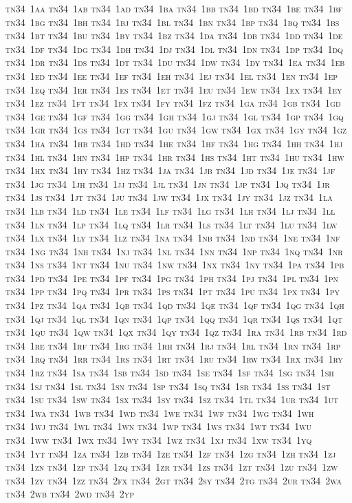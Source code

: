 \documentclass[12pt,a4paper]{article}
\begin{document}
\textsc{\lowercase{%
TN34~1AA	TN34~1AB	TN34~1AD	TN34~1BA	TN34~1BB	TN34~1BD
TN34~1BE	TN34~1BF	TN34~1BG	TN34~1BH	TN34~1BJ	TN34~1BL
TN34~1BN	TN34~1BP	TN34~1BQ	TN34~1BS	TN34~1BT	TN34~1BU
TN34~1BY	TN34~1BZ	TN34~1DA	TN34~1DB	TN34~1DD	TN34~1DE
TN34~1DF	TN34~1DG	TN34~1DH	TN34~1DJ	TN34~1DL	TN34~1DN
TN34~1DP	TN34~1DQ	TN34~1DR	TN34~1DS	TN34~1DT	TN34~1DU
TN34~1DW	TN34~1DY	TN34~1EA	TN34~1EB	TN34~1ED	TN34~1EE
TN34~1EF	TN34~1EH	TN34~1EJ	TN34~1EL	TN34~1EN	TN34~1EP
TN34~1EQ	TN34~1ER	TN34~1ES	TN34~1ET	TN34~1EU	TN34~1EW
TN34~1EX	TN34~1EY	TN34~1EZ	TN34~1FT	TN34~1FX	TN34~1FY
TN34~1FZ	TN34~1GA	TN34~1GB	TN34~1GD	TN34~1GE	TN34~1GF
TN34~1GG	TN34~1GH	TN34~1GJ	TN34~1GL	TN34~1GP	TN34~1GQ
TN34~1GR	TN34~1GS	TN34~1GT	TN34~1GU	TN34~1GW	TN34~1GX
TN34~1GY	TN34~1GZ	TN34~1HA	TN34~1HB	TN34~1HD	TN34~1HE
TN34~1HF	TN34~1HG	TN34~1HH	TN34~1HJ	TN34~1HL	TN34~1HN
TN34~1HP	TN34~1HR	TN34~1HS	TN34~1HT	TN34~1HU	TN34~1HW
TN34~1HX	TN34~1HY	TN34~1HZ	TN34~1JA	TN34~1JB	TN34~1JD
TN34~1JE	TN34~1JF	TN34~1JG	TN34~1JH	TN34~1JJ	TN34~1JL
TN34~1JN	TN34~1JP	TN34~1JQ	TN34~1JR	TN34~1JS	TN34~1JT
TN34~1JU	TN34~1JW	TN34~1JX	TN34~1JY	TN34~1JZ	TN34~1LA
TN34~1LB	TN34~1LD	TN34~1LE	TN34~1LF	TN34~1LG	TN34~1LH
TN34~1LJ	TN34~1LL	TN34~1LN	TN34~1LP	TN34~1LQ	TN34~1LR
TN34~1LS	TN34~1LT	TN34~1LU	TN34~1LW	TN34~1LX	TN34~1LY
TN34~1LZ	TN34~1NA	TN34~1NB	TN34~1ND	TN34~1NE	TN34~1NF
TN34~1NG	TN34~1NH	TN34~1NJ	TN34~1NL	TN34~1NN	TN34~1NP
TN34~1NQ	TN34~1NR	TN34~1NS	TN34~1NT	TN34~1NU	TN34~1NW
TN34~1NX	TN34~1NY	TN34~1PA	TN34~1PB	TN34~1PD	TN34~1PE
TN34~1PF	TN34~1PG	TN34~1PH	TN34~1PJ	TN34~1PL	TN34~1PN
TN34~1PP	TN34~1PQ	TN34~1PR	TN34~1PS	TN34~1PT	TN34~1PU
TN34~1PX	TN34~1PY	TN34~1PZ	TN34~1QA	TN34~1QB	TN34~1QD
TN34~1QE	TN34~1QF	TN34~1QG	TN34~1QH	TN34~1QJ	TN34~1QL
TN34~1QN	TN34~1QP	TN34~1QQ	TN34~1QR	TN34~1QS	TN34~1QT
TN34~1QU	TN34~1QW	TN34~1QX	TN34~1QY	TN34~1QZ	TN34~1RA
TN34~1RB	TN34~1RD	TN34~1RE	TN34~1RF	TN34~1RG	TN34~1RH
TN34~1RJ	TN34~1RL	TN34~1RN	TN34~1RP	TN34~1RQ	TN34~1RR
TN34~1RS	TN34~1RT	TN34~1RU	TN34~1RW	TN34~1RX	TN34~1RY
TN34~1RZ	TN34~1SA	TN34~1SB	TN34~1SD	TN34~1SE	TN34~1SF
TN34~1SG	TN34~1SH	TN34~1SJ	TN34~1SL	TN34~1SN	TN34~1SP
TN34~1SQ	TN34~1SR	TN34~1SS	TN34~1ST	TN34~1SU	TN34~1SW
TN34~1SX	TN34~1SY	TN34~1SZ	TN34~1TL	TN34~1UR	TN34~1UT
TN34~1WA	TN34~1WB	TN34~1WD	TN34~1WE	TN34~1WF	TN34~1WG
TN34~1WH	TN34~1WJ	TN34~1WL	TN34~1WN	TN34~1WP	TN34~1WS
TN34~1WT	TN34~1WU	TN34~1WW	TN34~1WX	TN34~1WY	TN34~1WZ
TN34~1XJ	TN34~1XW	TN34~1YQ	TN34~1YT	TN34~1ZA	TN34~1ZB
TN34~1ZE	TN34~1ZF	TN34~1ZG	TN34~1ZH	TN34~1ZJ	TN34~1ZN
TN34~1ZP	TN34~1ZQ	TN34~1ZR	TN34~1ZS	TN34~1ZT	TN34~1ZU
TN34~1ZW	TN34~1ZY	TN34~1ZZ	TN34~2FX	TN34~2GT	TN34~2SY
TN34~2TG	TN34~2UR	TN34~2WA	TN34~2WB	TN34~2WD	TN34~2YP
}}
\end{document}
